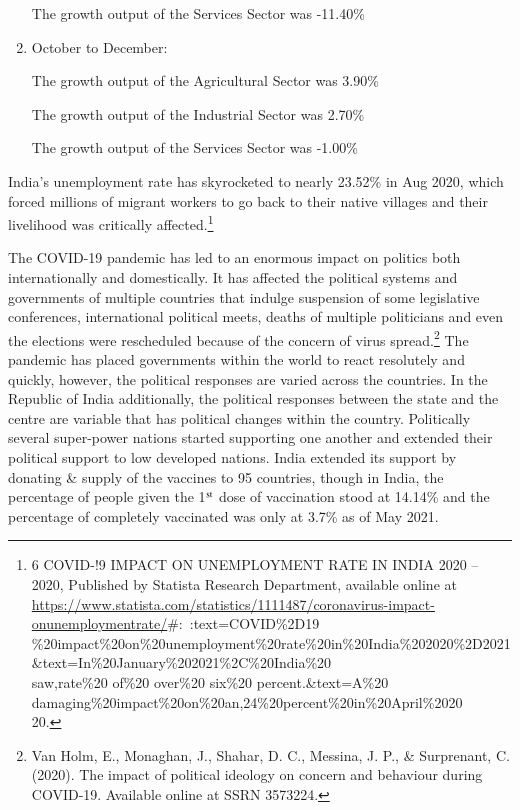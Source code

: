 \begin{multicols}{2}
\begin{enumerate}[label=$\blacktriangleright$]
The growth output of the Services Sector was -11.40\% 

\item October to December:

The growth output of the Agricultural Sector was 3.90\%

The growth output of the Industrial Sector was 2.70\%

The growth output of the Services Sector was -1.00\%
\end{enumerate}

\noi
India’s unemployment rate has skyrocketed to nearly 23.52\% in Aug 2020, which
forced millions of migrant workers to go back to their native villages and their
livelihood was critically affected.\footnote{6 COVID-!9 IMPACT ON UNEMPLOYMENT RATE IN INDIA 2020 – 2020, Published by Statista Research Department, available online at\\ \url{https://www.statista.com/statistics/1111487/coronavirus-impact-onunemploymentrate/}\#:~:text=COVID\%2D19\\\%20impact\%20on\%20unemployment\%20rate\%20in\%20India\%202020\%2D2021
\&text=In\%20January\%202021\%2C\%20India\%20\\saw,rate\%20 of\%20 over\%20 six\%20 percent.\&text=A\%20 damaging\%20impact\%20on\%20an,24\%20percent\%20in\%20April\%2020\\20.}


\noi
The COVID-19 pandemic has led to an enormous impact on politics both internationally and
domestically. It has affected the political systems and governments of multiple countries that
indulge suspension of some legislative conferences, international political meets, deaths of
multiple politicians and even the elections were rescheduled because of the concern of virus
spread.\footnote{Van Holm, E., Monaghan, J., Shahar, D. C., Messina, J. P., \& Surprenant, C. (2020). The impact of political ideology on concern and behaviour during COVID-19. Available online at SSRN 3573224.} The pandemic has placed governments within the world to react resolutely and
quickly, however, the political responses are varied across the countries. In the Republic of
India additionally, the political responses between the state and the centre are variable that
has political changes within the country. Politically several super-power nations started
supporting one another and extended their political support to low developed nations. India
extended its support by donating \& supply of the vaccines to 95 countries, though in India,
the percentage of people given the 1$^{\rm st}$ dose of vaccination stood at 14.14\% and the percentage
of completely vaccinated was only at 3.7\% as of May 2021. 


\end{multicols}
